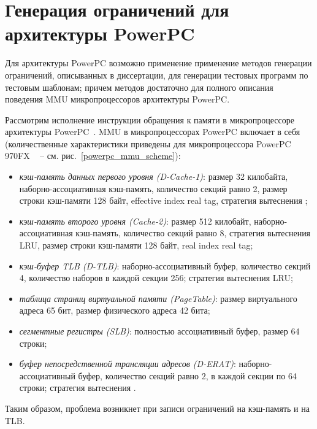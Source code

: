 

\section{Генерация ограничений для архитектуры PowerPC}

\begin{utv}
Для архитектуры PowerPC возможно применение применение методов
генерации ограничений, описыванных в диссертации, для генерации
тестовых программ по тестовым шаблонам; причем методов достаточно
для полного описания поведения MMU микропроцессоров архитектуры
PowerPC.
\end{utv}

Рассмотрим исполнение инструкции обращения к памяти в
микропроцессоре архитектуры PowerPC~\cite{shnitman}. MMU в
микропроцессорах PowerPC включает в себя (количественные
характеристики приведены для микропроцессора PowerPC 970FX
~\cite{PowerPC970FXUserManual} -- см.
рис.~\ref{powerpc_mmu_scheme}):
\begin{itemize}
  \item \emph{кэш-память данных первого уровня (D-Cache-1)}: размер 32
килобайта, наборно-ассоциативная кэш-память, количество секций равно
2, размер строки кэш-памяти 128 байт, effective index real tag,
стратегия вытеснения \LRU;
  \item \emph{кэш-память второго уровня (Cache-2)}: размер 512
  килобайт, наборно-ассоциативная кэш-память, количество секций
  равно 8, стратегия вытеснения LRU, размер строки кэш-памяти 128
  байт, real index real tag;
  \item \emph{кэш-буфер TLB (D-TLB)}: наборно-ассоциативный буфер,
  количество секций 4, количество наборов в каждой секции 256;
  стратегия вытеснения LRU;
  \item \emph{таблица страниц виртуальной памяти (PageTable)}: размер
  виртуального адреса 65 бит, размер физического адреса 42 бита;
  \item \emph{сегментные регистры (SLB)}: полностью ассоциативный
  буфер, размер 64 строки;
  \item \emph{буфер непосредственной трансляции адресов (D-ERAT)}:
  наборно-ассоциативный буфер, количество секций равно 2, в каждой
  секции по 64 строки; стратегия вытеснения \FIFO.
\end{itemize}
Таким образом, проблема возникнет при записи ограничений на
кэш-память и на TLB.

